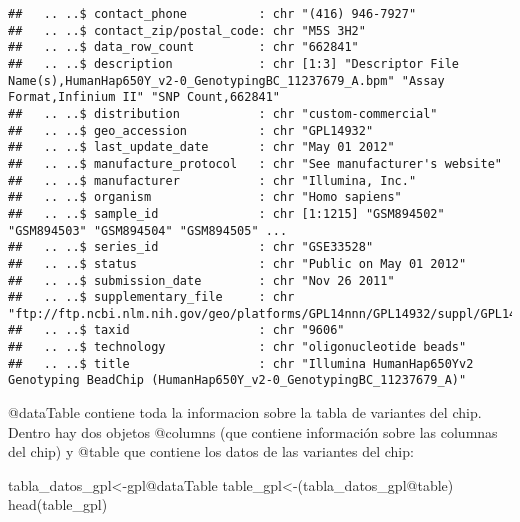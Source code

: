 \documentclass[
]{article}
\newenvironment{Shaded}{\begin{snugshade}}{\end{snugshade}}
\newcommand{\FunctionTok}[1]{\textcolor[rgb]{0.00,0.00,0.00}{#1}}
\newcommand{\NormalTok}[1]{#1}
\newcommand{\OtherTok}[1]{\textcolor[rgb]{0.56,0.35,0.01}{#1}}
\newcommand{\SpecialCharTok}[1]{\textcolor[rgb]{0.00,0.00,0.00}{#1}}
\begin{document}
\begin{verbatim}
##   .. ..$ contact_phone          : chr "(416) 946-7927"
##   .. ..$ contact_zip/postal_code: chr "M5S 3H2"
##   .. ..$ data_row_count         : chr "662841"
##   .. ..$ description            : chr [1:3] "Descriptor File Name(s),HumanHap650Y_v2-0_GenotypingBC_11237679_A.bpm" "Assay Format,Infinium II" "SNP Count,662841"
##   .. ..$ distribution           : chr "custom-commercial"
##   .. ..$ geo_accession          : chr "GPL14932"
##   .. ..$ last_update_date       : chr "May 01 2012"
##   .. ..$ manufacture_protocol   : chr "See manufacturer's website"
##   .. ..$ manufacturer           : chr "Illumina, Inc."
##   .. ..$ organism               : chr "Homo sapiens"
##   .. ..$ sample_id              : chr [1:1215] "GSM894502" "GSM894503" "GSM894504" "GSM894505" ...
##   .. ..$ series_id              : chr "GSE33528"
##   .. ..$ status                 : chr "Public on May 01 2012"
##   .. ..$ submission_date        : chr "Nov 26 2011"
##   .. ..$ supplementary_file     : chr "ftp://ftp.ncbi.nlm.nih.gov/geo/platforms/GPL14nnn/GPL14932/suppl/GPL14932_Mahdi_650Yv2_manifest.csv.gz"
##   .. ..$ taxid                  : chr "9606"
##   .. ..$ technology             : chr "oligonucleotide beads"
##   .. ..$ title                  : chr "Illumina HumanHap650Yv2 Genotyping BeadChip (HumanHap650Y_v2-0_GenotypingBC_11237679_A)"
\end{verbatim}

@dataTable contiene toda la informacion sobre la tabla de variantes del
chip. Dentro hay dos objetos @columns (que contiene información sobre
las columnas del chip) y @table que contiene los datos de las variantes
del chip:

\begin{Shaded}
\begin{Highlighting}[]
\NormalTok{tabla\_datos\_gpl}\OtherTok{\textless{}{-}}\NormalTok{gpl}\SpecialCharTok{@}\NormalTok{dataTable}
\NormalTok{table\_gpl}\OtherTok{\textless{}{-}}\NormalTok{(tabla\_datos\_gpl}\SpecialCharTok{@}\NormalTok{table)}
\FunctionTok{head}\NormalTok{(table\_gpl)}
\end{Highlighting}
\end{Shaded}
\end{document}
